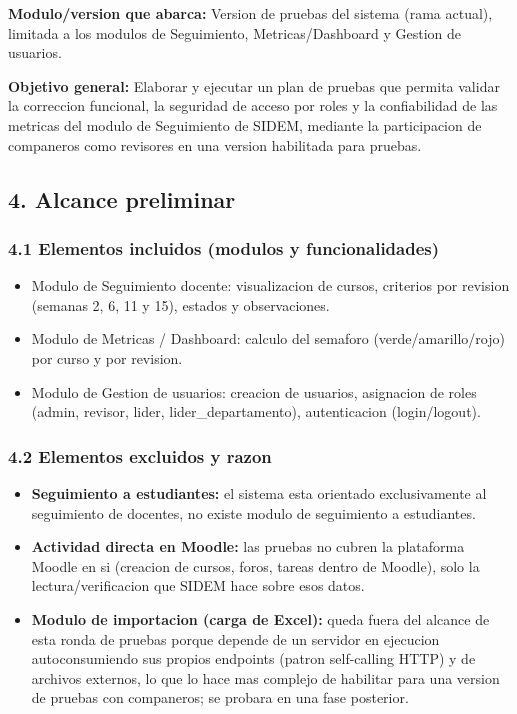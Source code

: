 \documentclass[11pt,a4paper,oneside]{report}
\newcommand{\code}[1]{\leavevmode{\ttfamily\color{tinta}#1}}
\begin{document}
\textbf{Modulo/version que abarca:} Version de pruebas del sistema (rama \code{main} actual), limitada a los modulos de Seguimiento, Metricas/Dashboard y Gestion de usuarios.


\textbf{Objetivo general:} Elaborar y ejecutar un plan de pruebas que permita validar la correccion funcional, la seguridad de acceso por roles y la confiabilidad de las metricas del modulo de Seguimiento de SIDEM, mediante la participacion de companeros como revisores en una version habilitada para pruebas.


\subsection*{4. Alcance preliminar}

\subsubsection*{4.1 Elementos incluidos (modulos y funcionalidades)}

\begin{itemize}
\item Modulo de Seguimiento docente: visualizacion de cursos, criterios por revision (semanas 2, 6, 11 y 15), estados y observaciones.
\item Modulo de Metricas / Dashboard: calculo del semaforo (verde/amarillo/rojo) por curso y por revision.
\item Modulo de Gestion de usuarios: creacion de usuarios, asignacion de roles (admin, revisor, lider, lider\_departamento), autenticacion (login/logout).
\end{itemize}

\subsubsection*{4.2 Elementos excluidos y razon}

\begin{itemize}
\item \textbf{Seguimiento a estudiantes:} el sistema esta orientado exclusivamente al seguimiento de docentes, no existe modulo de seguimiento a estudiantes.
\item \textbf{Actividad directa en Moodle:} las pruebas no cubren la plataforma Moodle en si (creacion de cursos, foros, tareas dentro de Moodle), solo la lectura/verificacion que SIDEM hace sobre esos datos.
\item \textbf{Modulo de importacion (carga de Excel):} queda fuera del alcance de esta ronda de pruebas porque depende de un servidor en ejecucion autoconsumiendo sus propios endpoints (patron self-calling HTTP) y de archivos externos, lo que lo hace mas complejo de habilitar para una version de pruebas con companeros; se probara en una fase posterior.
\end{itemize}
\end{document}

